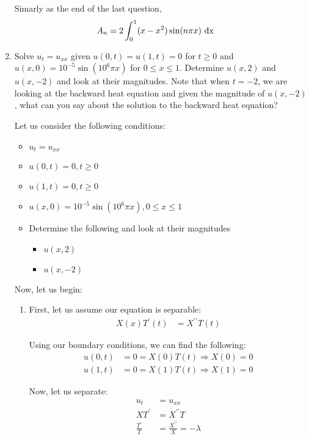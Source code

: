 \documentclass{article}
\begin{document}
\begin{enumerate}
Simarly as the end of the last question,
%
\begin{align}
  A_n & = 2 \int^1_0 (x-x^2) \sin(n \pi x) \text{ dx }
\end{align}
%
%
\newpage
%
%
  \item Solve $u_t = u_{xx}$ given $u(0, t) = u(1, t) = 0$ for $t \geq 0$ and $u(x, 0) = 10^{-5} \sin(10^6 \pi x)$ for $0 \leq x \leq 1$. Determine $u(x, 2)$ and $u(x, -2)$ and look at their magnitudes. Note that when $t = -2$, we are looking at the backward heat equation and given the magnitude of $u(x, -2)$, what can you say about the solution to the backward heat equation?

  Let us consider the following conditions:
  \begin{itemize}
    \item $u_t = u_{xx}$
    \item $u(0, t) = 0, t \geq 0$
    \item $u(1, t) = 0, t \geq 0$
    \item $u(x, 0) = 10^{-5} \sin(10^6 \pi x), 0 \leq x \leq 1$
    \item Determine the following and look at their magnitudes
    \begin{itemize}
      \item $u(x, 2)$
      \item $u(x, -2)$
    \end{itemize}
  \end{itemize}

  Now, let us begin:

  \begin{enumerate}
    \item First, let us assume our equation is separable:
    \begin{align}
      X(x)T^\prime(t) & = X^{\prime\prime}T(t)
    \end{align}

    Using our boundary conditions, we can find the following:
    \begin{align}
      u(0, t) & = 0 = X(0)T(t) \Rightarrow X(0) = 0\\
      u(1, t) & = 0 = X(1)T(t) \Rightarrow X(1) = 0
    \end{align}

    Now, let us separate:
    \begin{align}
      u_t & = u_{xx}\\
      XT^\prime & = X^{\prime\prime}T\\
      \frac{T^\prime}{T} & = \frac{X^{\prime\prime}}{X} = -\lambda
    \end{align}


\end{enumerate}
\end{enumerate}
\end{document}
